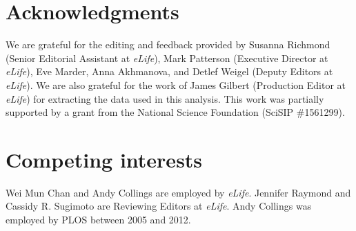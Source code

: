 \documentclass[10pt,letterpaper]{article}
\begin{document}
%
%
\section*{Acknowledgments}
We are grateful for the editing and feedback provided by Susanna Richmond (Senior Editorial Assistant at \textit{eLife}), Mark Patterson (Executive Director at \textit{eLife}), Eve Marder, Anna Akhmanova, and Detlef Weigel (Deputy Editors at \textit{eLife}). We are also grateful for the work of James Gilbert (Production Editor at \textit{eLife}) for extracting the data used in this analysis. This work was partially supported by a grant from the National Science Foundation (SciSIP \#1561299). 

%
%
\section*{Competing interests}
Wei Mun Chan and Andy Collings are employed by \textit{eLife}. Jennifer Raymond and Cassidy R. Sugimoto are Reviewing Editors at \textit{eLife}. Andy Collings was employed by PLOS between 2005 and 2012.

\nolinenumbers

%
%
% 



\end{document}
